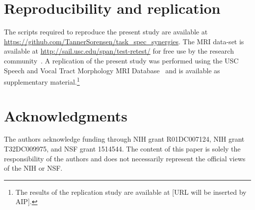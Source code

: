 \documentclass[preprint]{JASAnew}\usepackage[]{graphicx}\usepackage[]{color}
\begin{document}
\section{Reproducibility and replication}

The scripts required to reproduce the present study are available at \url{https://github.com/TannerSorensen/task_spec_synergies}.
%
The MRI data-set is available at \url{http://sail.usc.edu/span/test-retest/} for free use by the research community~\citep[see][]{toger2017test}.
%
A replication of the present study was performed using the USC Speech and Vocal Tract Morphology MRI Database~\citep{sorensen2017database} and is available as supplementary material.\footnote{The results of the replication study are available at [URL will be inserted by AIP].}

\section{Acknowledgments} 

The authors acknowledge funding through NIH grant R01DC007124, NIH grant T32DC009975, and NSF grant 1514544. The content of this paper is solely the responsibility of the authors and does not necessarily represent the official views of the NIH or NSF.

%
\end{document}
